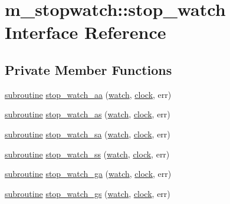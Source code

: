 \hypertarget{interfacem__stopwatch_1_1stop__watch}{}\section{m\+\_\+stopwatch\+:\+:stop\+\_\+watch Interface Reference}
\label{interfacem__stopwatch_1_1stop__watch}
\subsection*{Private Member Functions}
\begin{DoxyCompactItemize}
\item 
\hyperlink{M__stopwatch_83_8txt_acfbcff50169d691ff02d4a123ed70482}{subroutine} \hyperlink{interfacem__stopwatch_1_1stop__watch_a5da8fbfd8a9487961ec55f42568793df}{stop\+\_\+watch\+\_\+aa} (\hyperlink{read__watch_83_8txt_ad2129669fa47b8899641309620add095}{watch}, \hyperlink{stop__watch_83_8txt_a148c035b430d6edf5413dbd2704facfb}{clock}, err)
\item 
\hyperlink{M__stopwatch_83_8txt_acfbcff50169d691ff02d4a123ed70482}{subroutine} \hyperlink{interfacem__stopwatch_1_1stop__watch_a85fe87e33db92b337c128d94e160c2ab}{stop\+\_\+watch\+\_\+as} (\hyperlink{read__watch_83_8txt_ad2129669fa47b8899641309620add095}{watch}, \hyperlink{stop__watch_83_8txt_a148c035b430d6edf5413dbd2704facfb}{clock}, err)
\item 
\hyperlink{M__stopwatch_83_8txt_acfbcff50169d691ff02d4a123ed70482}{subroutine} \hyperlink{interfacem__stopwatch_1_1stop__watch_a90888921934ec6271a7f9dd111ad1f9d}{stop\+\_\+watch\+\_\+sa} (\hyperlink{read__watch_83_8txt_ad2129669fa47b8899641309620add095}{watch}, \hyperlink{stop__watch_83_8txt_a148c035b430d6edf5413dbd2704facfb}{clock}, err)
\item 
\hyperlink{M__stopwatch_83_8txt_acfbcff50169d691ff02d4a123ed70482}{subroutine} \hyperlink{interfacem__stopwatch_1_1stop__watch_aea9b4bc1eb43b9b9b3ccb5c0250aec43}{stop\+\_\+watch\+\_\+ss} (\hyperlink{read__watch_83_8txt_ad2129669fa47b8899641309620add095}{watch}, \hyperlink{stop__watch_83_8txt_a148c035b430d6edf5413dbd2704facfb}{clock}, err)
\item 
\hyperlink{M__stopwatch_83_8txt_acfbcff50169d691ff02d4a123ed70482}{subroutine} \hyperlink{interfacem__stopwatch_1_1stop__watch_a3b9a5aa22f56175c450b299f3ddc6ac1}{stop\+\_\+watch\+\_\+ga} (\hyperlink{read__watch_83_8txt_ad2129669fa47b8899641309620add095}{watch}, \hyperlink{stop__watch_83_8txt_a148c035b430d6edf5413dbd2704facfb}{clock}, err)
\item 
\hyperlink{M__stopwatch_83_8txt_acfbcff50169d691ff02d4a123ed70482}{subroutine} \hyperlink{interfacem__stopwatch_1_1stop__watch_a4f243b708c66f1239a7329363ac030f1}{stop\+\_\+watch\+\_\+gs} (\hyperlink{read__watch_83_8txt_ad2129669fa47b8899641309620add095}{watch}, \hyperlink{stop__watch_83_8txt_a148c035b430d6edf5413dbd2704facfb}{clock}, err)
\end{DoxyCompactItemize}


